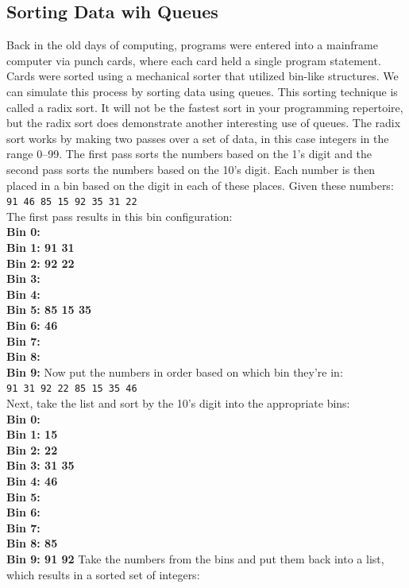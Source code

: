 \documentclass[12pt,a4paper,final,twoside,titlepage]{book}
\begin{document}
\subsection{Sorting Data wih Queues}
Back in the old days of computing, programs were entered into a mainframe computer via punch cards, where each card held a single program statement. Cards were sorted using a mechanical sorter that utilized bin-like structures. We can simulate this process by sorting data using queues. This sorting technique is called a radix sort. It will not be the fastest sort in your programming repertoire, but the radix sort does demonstrate another interesting use of queues.
The radix sort works by making two passes over a set of data, in this case integers in the range 0–99. The first pass sorts the numbers based on the 1’s digit and the second pass sorts the numbers based on the 10’s digit. Each number is then placed in a bin based on the digit in each of these places. Given these numbers:\\
\texttt{91 46 85 15 92 35 31 22}\\
The first pass results in this bin configuration:
\textbf{
\\Bin 0:
\\Bin 1: 91 31 
\\Bin 2: 92 22 
\\Bin 3:
\\Bin 4:
\\Bin 5: 85 15 35 
\\Bin 6: 46
\\Bin 7:
\\Bin 8:
\\Bin 9:}
Now put the numbers in order based on which bin they’re in:\\
\texttt{91 31 92 22 85 15 35 46}
\\Next, take the list and sort by the 10’s digit into the appropriate bins:
\textbf{
\\Bin 0:
\\Bin 1: 15 
\\Bin 2: 22 
\\Bin 3: 31 35 
\\Bin 4: 46 
\\Bin 5:
\\Bin 6:
\\Bin 7:
\\Bin 8: 85 
\\Bin 9: 91 92}
Take the numbers from the bins and put them back into a list, which results in a sorted set of integers:\\
\end{document}
